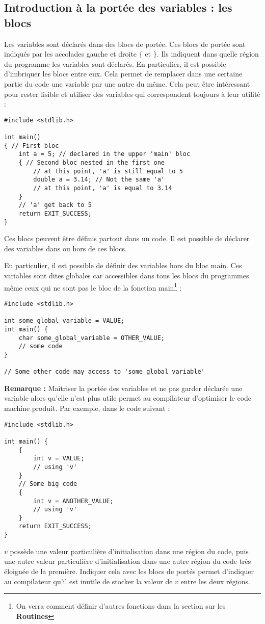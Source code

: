 \documentclass[../../../main.tex]{subfiles}
\begin{document}
\subsection{Introduction à la portée des variables : les blocs}
Les variables sont déclarés dans des blocs de portée. Ces blocs de portée sont indiqués par les accolades gauche et droite $\{$ et $\}$. Ils indiquent dans quelle région du programme les variables sont déclarés. En particulier, il est possible d'imbriquer les blocs entre eux. Cela permet de remplacer dans une certaine partie du code une variable par une autre du même. Cela peut être intéressant pour rester lisible et utiliser des variables qui correspondent toujours à leur utilité :
\begin{verbatim}
#include <stdlib.h>

int main()
{ // First bloc
	int a = 5; // declared in the upper 'main' bloc
	{ // Second bloc nested in the first one
		// at this point, 'a' is still equal to 5
		double a = 3.14; // Not the same 'a'
		// at this point, 'a' is equal to 3.14
	}
	// 'a' get back to 5
	return EXIT_SUCCESS;
}
\end{verbatim}
Ces blocs peuvent être définis partout dans un code. Il est possible de déclarer des variables dans ou hors de ces blocs.
 
En particulier, il est possible de définir des variables hors du bloc \textsf{main}. Ces variables sont dites globales car accessibles dans tous les blocs du programmes même ceux qui ne sont pas le bloc de la fonction \textsf{main}\footnote{On verra comment définir d'autres fonctions dans la section sur les \textbf{Routines}} :
\begin{verbatim}
#include <stdlib.h>

int some_global_variable = VALUE;
int main() {
	char some_global_variable = OTHER_VALUE;
	// some code
}

// Some other code may access to 'some_global_variable'
\end{verbatim}
\textbf{Remarque :} Maîtriser la portée des variables et ne pas garder déclarée une variable alors qu'elle n'est plus utile permet au compilateur d'optimiser le code machine produit. Par exemple, dans le code suivant :
\begin{verbatim}
#include <stdlib.h>

int main() {
	{
		int v = VALUE;
		// using 'v'
	}
	// Some big code
	{
		int v = ANOTHER_VALUE;
		// using 'v'
	}
	return EXIT_SUCCESS;
}
\end{verbatim}
$v$ possède une valeur particulière d'initialisation dans une région du code, puis une autre valeur particulière d'initialisation dans une autre région du code très éloignée de la première. Indiquer cela avec les blocs de portés permet d'indiquer au compilateur qu'il est inutile de stocker la valeur de $v$ entre les deux régions.
\end{document}
